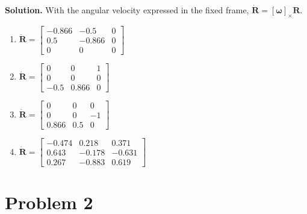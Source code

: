 \documentclass[11pt]{article}
\newcommand{\R}{\bm{R}}
\newcommand{\wvec}{\bm{\omega}}
\newcommand{\skewx}[1]{\left[#1\right]_{\times}}
\begin{document}
\textbf{Solution.} With the angular velocity expressed in the fixed frame, $\dot{\R}=\skewx{\wvec}\R$.
\begin{enumerate}[label=(\alph*), nosep]
\item $\dot{\R}=\begin{bmatrix}-0.866&-0.5&0\\0.5&-0.866&0\\0&0&0\end{bmatrix}$
\item $\dot{\R}=\begin{bmatrix}0&0&1\\0&0&0\\-0.5&0.866&0\end{bmatrix}$
\item $\dot{\R}=\begin{bmatrix}0&0&0\\0&0&-1\\0.866&0.5&0\end{bmatrix}$
\item $\dot{\R}=\begin{bmatrix}-0.474&0.218&0.371\\0.643&-0.178&-0.631\\0.267&-0.883&0.619\end{bmatrix}$
\end{enumerate}

\bigskip
\section*{Problem 2}
\end{document}
